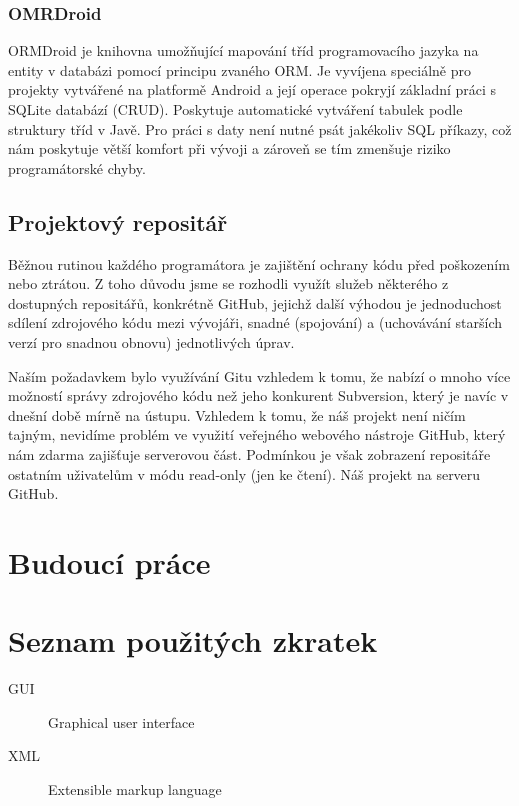 \documentclass[thesis=M,czech]{FITthesis}[2012/06/26]
\begin{document}
\subsection{OMRDroid}\label{ormdroid}
ORMDroid je knihovna umožňující mapování tříd programovacího jazyka na entity v databázi pomocí principu zvaného ORM. Je vyvíjena speciálně pro projekty vytvářené na platformě Android a její operace pokryjí základní práci s SQLite databází (CRUD). Poskytuje automatické vytváření tabulek podle struktury tříd v Javě. Pro práci s daty není nutné psát jakékoliv SQL příkazy, což nám poskytuje větší komfort při vývoji a zároveň se tím zmenšuje riziko programátorské chyby.

\section{Projektový repositář}
Běžnou rutinou každého programátora je zajištění ochrany kódu před poškozením nebo ztrátou. Z toho důvodu jsme se rozhodli využít služeb některého z dostupných repositářů, konkrétně GitHub\cite{github}, jejichž další výhodou je jednoduchost sdílení zdrojového kódu mezi vývojáři, snadné  (spojování) a  (uchovávání starších verzí pro snadnou obnovu) jednotlivých úprav.

Naším požadavkem bylo využívání Gitu\cite{git} vzhledem k tomu, že nabízí o mnoho více možností správy zdrojového kódu než jeho konkurent Subversion\cite{svn}, který je navíc v dnešní době mírně na ústupu. Vzhledem k tomu, že náš projekt není ničím tajným, nevidíme problém ve využití veřejného webového nástroje GitHub\cite{github}, který nám zdarma zajišťuje serverovou část. Podmínkou je však zobrazení repositáře ostatním uživatelům v módu read-only (jen ke čtení). Náš projekt na serveru GitHub\cite{github_project}.

\chapter{Budoucí práce}

\begin{conclusion}
\end{conclusion}




\appendix

\chapter{Seznam použitých zkratek}
\begin{description}
	\item[GUI] Graphical user interface
	\item[XML] Extensible markup language
\end{description}
\end{document}
